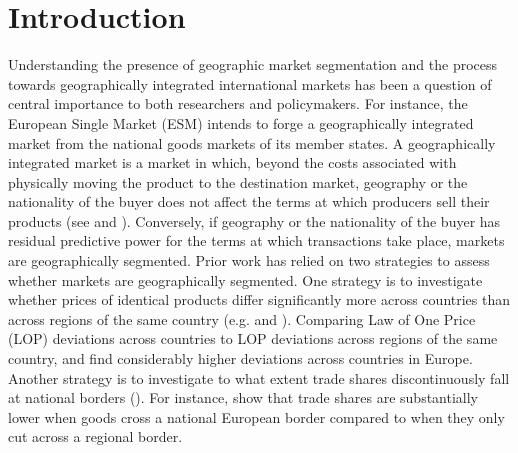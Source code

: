 \documentclass[11pt]{article}
\begin{document}
\newpage

\begin{spacing}{1}
\tableofcontents{}
\end{spacing}
\newpage 

\linenumbers
\section{Introduction}  
Understanding the presence of geographic market segmentation and the process towards geographically integrated international markets has been a question of central importance to both researchers and policymakers. For instance, the European Single Market (ESM) intends to forge a geographically integrated market from the national goods markets of its member states. A geographically integrated market is a market in which, beyond the costs associated with physically moving the product to the destination market, geography or the nationality of the buyer does not affect the terms at which producers sell their products (see \citet{Flam1992} and \citet{Goldberg1997}). Conversely, if geography or the nationality of the buyer has residual predictive power for the terms at which transactions take place, markets are geographically segmented. Prior work has relied on two strategies to assess whether markets are geographically segmented. One strategy is to investigate whether prices of identical products differ significantly more across countries than across regions of the same country (e.g. \citet{Engel1996} and \citet{Goldberg1997}). Comparing Law of One Price (LOP) deviations across countries to LOP deviations across regions of the same country, \citet{Beck2020} and \citet{Fontaine2020} find considerably higher deviations across countries in Europe. Another strategy is to investigate to what extent trade shares discontinuously fall at national borders (\citet{McCallum1995}). For instance, \citet{Santamaria2023} show that trade shares are substantially lower when goods cross a national European border compared to when they only cut across a regional border.
\end{document}
